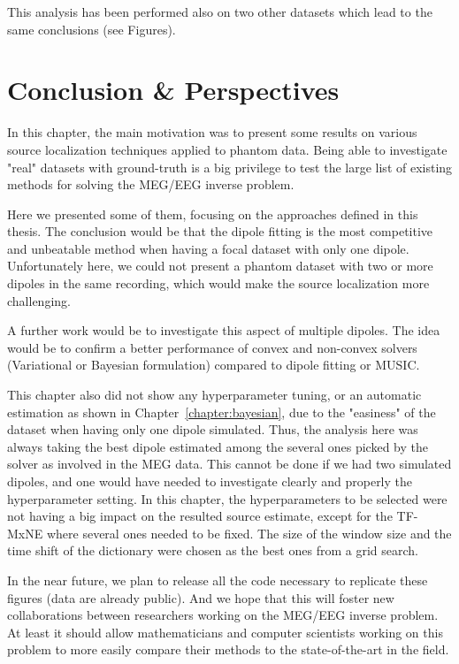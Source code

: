 This analysis has been performed also on two other datasets which lead to the same conclusions (see Figures).

\section{Conclusion \& Perspectives}
In this chapter, the main motivation was to present some results on various source localization techniques applied to phantom data. Being able to investigate "real" datasets with ground-truth is a big privilege to test the large list of existing methods for solving the MEG/EEG inverse problem.

Here we presented some of them, focusing on the approaches defined in this thesis. The conclusion would be that the dipole fitting is the most competitive and unbeatable method when having a focal dataset with only one dipole. Unfortunately here, we could not present a phantom dataset with two or more dipoles in the same recording, which would make the source localization more challenging.

A further work would be to investigate this aspect of multiple dipoles. The idea would be to confirm a better performance of convex and non-convex solvers (Variational or Bayesian formulation) compared to dipole fitting or MUSIC.

This chapter also did not show any hyperparameter tuning, or an automatic estimation as shown in Chapter~\ref{chapter:bayesian}, due to the "easiness" of the dataset when having only one dipole simulated. Thus, the analysis here was always taking the best dipole estimated among the several ones picked by the solver as involved in the MEG data. This cannot be done if we had two simulated dipoles, and one would have needed to investigate clearly and properly the hyperparameter setting. In this chapter, the hyperparameters to be selected were not having a big impact on the resulted source estimate, except for the TF-MxNE where several ones needed to be fixed. The size of the window size and the time shift of the dictionary were chosen as the best ones from a grid search.

In the near future, we plan to release all the code necessary to replicate these figures (data are already public). And we hope that this will foster new collaborations between researchers working on the MEG/EEG inverse problem. At least it should allow mathematicians and computer scientists working on this problem to more easily compare their methods to the state-of-the-art in the field.
